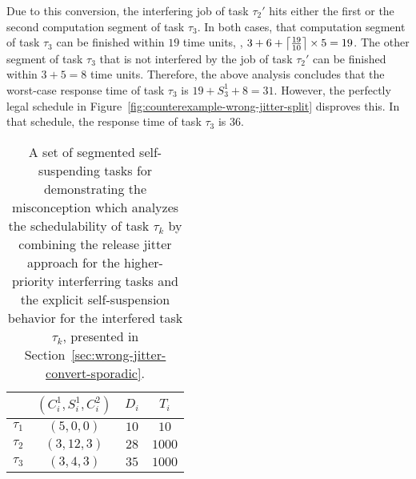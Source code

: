 Due to this conversion, the interfering job of task $\tau_2'$
hits either the first or the second computation segment of task
$\tau_3$. In both cases, that computation segment of task $\tau_3$ can be
finished within $19$ time units, \ie, $3+6 +
\left\lceil{\frac{19}{10}}\right\rceil\times 5 = 19$. The other segment of task
$\tau_3$ that is not interfered by the job of task $\tau_2'$ 
 can be finished within $3+5=8$ time units.  Therefore, the
above analysis concludes that the worst-case response time of task
$\tau_3$ is $19+S_3^1 + 8 = 31$.
However, the perfectly legal schedule in
Figure~\ref{fig:counterexample-wrong-jitter-split} disproves this.  In
that schedule, the response time of task $\tau_3$ is $36$.

\begin{table} [t]
\centering
    \begin{tabular}{|c|c|c|c|}
 \hline
        & $(C_i^1, S_i^1, C_i^2)$ &  $D_i$ & $T_i$ \\ 
        \hline
        $\tau_1$ & $(5, 0, 0)$ &  $10$ & $10$\\ 
        $\tau_2$ & $(3, 12, 3)$ &  $28$ & $1000$\\ 
        $\tau_3$ & $(3, 4, 3)$ & $35$ & $1000$  \\ 
        \hline
    \end{tabular} 
    \caption{A set of segmented self-suspending tasks for demonstrating the misconception which analyzes the schedulability of task $\tau_k$ by combining the release jitter approach for the higher-priority interferring tasks and  the explicit self-suspension behavior for the interfered task $\tau_k$, presented in Section~\ref{sec:wrong-jitter-convert-sporadic}.}
    \label{table:ex-wrong-jitter-split}
\end{table}


